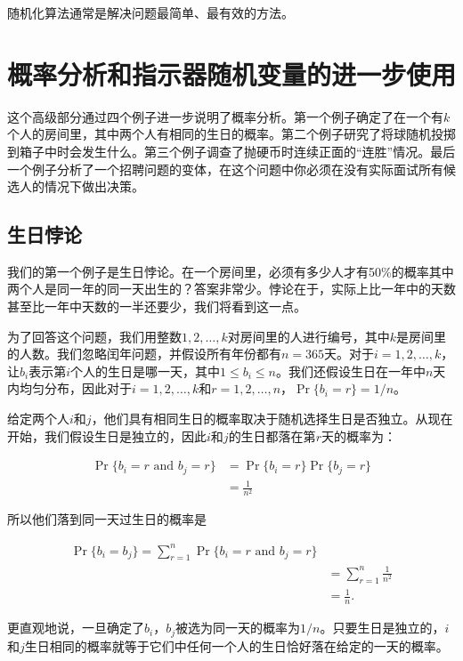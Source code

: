 \documentclass[lang=cn,newtx,10pt,scheme=chinese]{elegantbook}
\begin{document}
随机化算法通常是解决问题最简单、最有效的方法。

\section{概率分析和指示器随机变量的进一步使用}\label{section-5.4}

这个高级部分通过四个例子进一步说明了概率分析。第一个例子确定了在一个有$k$个人的房间里，其中两个人有相同的生日的概率。第二个例子研究了将球随机投掷到箱子中时会发生什么。第三个例子调查了抛硬币时连续正面的“连胜”情况。最后一个例子分析了一个招聘问题的变体，在这个问题中你必须在没有实际面试所有候选人的情况下做出决策。

\subsection{生日悖论}

我们的第一个例子是生日悖论。在一个房间里，必须有多少人才有50\%的概率其中两个人是同一年的同一天出生的？答案非常少。悖论在于，实际上比一年中的天数甚至比一年中天数的一半还要少，我们将看到这一点。

为了回答这个问题，我们用整数$1,2,\ldots,k$对房间里的人进行编号，其中$k$是房间里的人数。我们忽略闰年问题，并假设所有年份都有$n=365$天。对于$i=1,2,\ldots,k$，让$b_i$表示第$i$个人的生日是哪一天，其中$1\leq b_i\leq n$。我们还假设生日在一年中$n$天内均匀分布，因此对于$i=1,2,\ldots,k$和$r=1,2,\ldots,n$，$\operatorname{Pr}\{b_i=r\}=1/n$。

给定两个人$i$和$j$，他们具有相同生日的概率取决于随机选择生日是否独立。从现在开始，我们假设生日是独立的，因此$i$和$j$的生日都落在第$r$天的概率为：

$$
\begin{aligned}
\operatorname{Pr}\{b_i=r \text { and } b_j=r\} & =\operatorname{Pr}\{b_i=r\} \operatorname{Pr}\{b_j=r\} \\
& =\frac{1}{n^2}
\end{aligned}
$$

所以他们落到同一天过生日的概率是

$$
\begin{aligned}
\operatorname{Pr}\{b_i=b_j\}=\sum_{r=1}^n \operatorname{Pr}\{b_i=r \text { and } b_j=r\} \\
& =\sum_{r=1}^n \frac{1}{n^2} \\
& =\frac{1}{n} .
\end{aligned}
$$

更直观地说，一旦确定了$b_i$，$b_j$被选为同一天的概率为$1/n$。只要生日是独立的，$i$和$j$生日相同的概率就等于它们中任何一个人的生日恰好落在给定的一天的概率。
\end{document}
